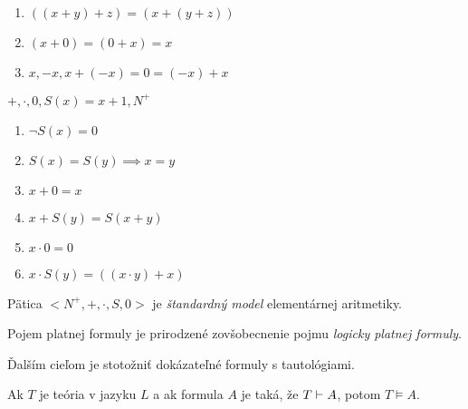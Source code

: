 \begin{priklad}
    \begin{enumerate}
            \item $((x+y)+z) = (x+(y+z))$
            \item $(x+0) = (0+x) = x$
            \item $x, -x, x+(-x) = 0 = (-x)+x$
    \end{enumerate}
\end{priklad}

\begin{priklad}

    $+, \cdot, 0, S(x) = x+1, N^+ $
    \begin{enumerate}
	\item $\neg S(x) = 0$
	\item $S(x) = S(y) \implies x=y$
	\item $x+0 = x$
	\item $x+S(y) = S(x+y)$
	\item $x \cdot 0 = 0$
	\item $x\cdot S(y) = ((x\cdot y) + x)$
    \end{enumerate}

    Pätica $<N^+, +, \cdot, S, 0>$ je
    \emph{štandardný model} elementárnej aritmetiky.
\end{priklad}

\par
Pojem platnej formuly je prirodzené zovšobecnenie pojmu \emph{logicky platnej
formuly}.

Ďalším cieľom je stotožniť dokázateľné formuly s tautológiami.

\begin{veta}[o korektnosti]
    Ak $T$ je teória v jazyku $L$ a ak formula $A$ je taká,
    že $T \vdash A$, potom $T \models A$.
\end{veta}


